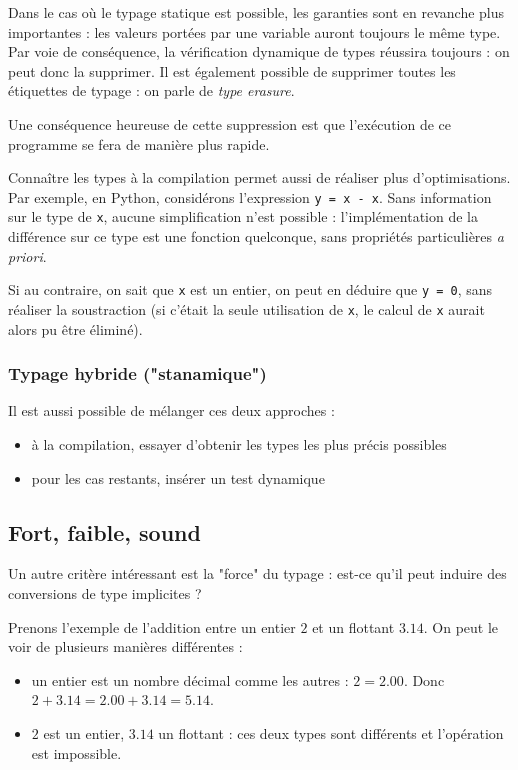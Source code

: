Dans le cas où le typage statique est possible, les garanties sont en revanche
plus importantes : les valeurs portées par une variable auront toujours le même
type. Par voie de conséquence, la vérification dynamique de types réussira
toujours : on peut donc la supprimer. Il est également possible de supprimer
toutes les étiquettes de typage : on parle de \emph{type erasure}.

Une conséquence heureuse de cette suppression est que l'exécution de ce
programme se fera de manière plus rapide.

Connaître les types à la compilation permet aussi de réaliser plus
d'optimisations. Par exemple, en Python, considérons l'expression \texttt{y = x
- x}. Sans information sur le type de \texttt{x}, aucune simplification n'est
possible : l'implémentation de la différence sur ce type est une fonction
quelconque, sans propriétés particulières \emph{a priori}.

Si au contraire, on sait que \texttt{x} est un entier, on peut en déduire que
\texttt{y = 0}, sans réaliser la soustraction (si c'était la seule utilisation
de \texttt{x}, le calcul de \texttt{x} aurait alors pu être éliminé).

\subsubsection{Typage hybride ("stanamique")}

Il est aussi possible de mélanger ces deux approches :

\begin{itemize}
\item
  à la compilation, essayer d'obtenir les types les plus précis
  possibles
\item
  pour les cas restants, insérer un test dynamique
\end{itemize}

\subsection{Fort, faible, sound}

Un autre critère intéressant est la "force" du typage : est-ce qu'il peut
induire des conversions de type implicites ?

Prenons l'exemple de l'addition entre un entier $2$ et un flottant $3.14$. On
peut le voir de plusieurs manières différentes :

\begin{itemize}
\item
  un entier est un nombre décimal comme les autres : $2 = 2.00$. Donc
  $2 + 3.14 = 2.00 + 3.14 = 5.14$.
\item
  $2$ est un entier, $3.14$ un flottant : ces deux types sont différents et
  l'opération est impossible.
\end{itemize}

